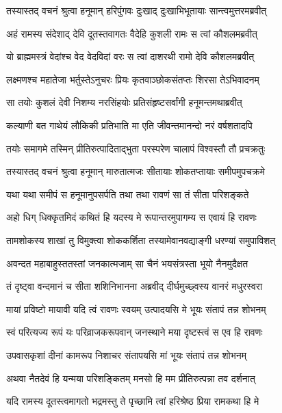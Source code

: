
\twolineshloka
{तस्यास्तद् वचनं श्रुत्वा हनूमान् हरिपुंगवः}
{दुःखाद् दुःखाभिभूतायाः सान्त्वमुत्तरमब्रवीत्} %

\twolineshloka
{अहं रामस्य संदेशाद् देवि दूतस्तवागतः}
{वैदेहि कुशली रामः स त्वां कौशलमब्रवीत्} %

\twolineshloka
{यो ब्राह्ममस्त्रं वेदांश्च वेद वेदविदां वरः}
{स त्वां दाशरथी रामो देवि कौशलमब्रवीत्} %

\twolineshloka
{लक्ष्मणश्च महातेजा भर्तुस्तेऽनुचरः प्रियः}
{कृतवाञ्छोकसंतप्तः शिरसा तेऽभिवादनम्} %

\twolineshloka
{सा तयोः कुशलं देवी निशम्य नरसिंहयोः}
{प्रतिसंहृष्टसर्वांगी हनूमन्तमथाब्रवीत्} %

\twolineshloka
{कल्याणी बत गाथेयं लौकिकी प्रतिभाति मा}
{एति जीवन्तमानन्दो नरं वर्षशतादपि} %

\twolineshloka
{तयोः समागमे तस्मिन् प्रीतिरुत्पादिताद्भुता}
{परस्परेण चालापं विश्वस्तौ तौ प्रचक्रतुः} %

\twolineshloka
{तस्यास्तद् वचनं श्रुत्वा हनूमान् मारुतात्मजः}
{सीतायाः शोकतप्तायाः समीपमुपचक्रमे} %

\twolineshloka
{यथा यथा समीपं स हनूमानुपसर्पति}
{तथा तथा रावणं सा तं सीता परिशङ्कते} %

\twolineshloka
{अहो धिग् धिक्कृतमिदं कथितं हि यदस्य मे}
{रूपान्तरमुपागम्य स एवायं हि रावणः} %

\twolineshloka
{तामशोकस्य शाखां तु विमुक्त्वा शोककर्शिता}
{तस्यामेवानवद्याङ्गी धरण्यां समुपाविशत्} %

\twolineshloka
{अवन्दत महाबाहुस्ततस्तां जनकात्मजाम्}
{सा चैनं भयसंत्रस्ता भूयो नैनमुदैक्षत} %

\twolineshloka
{तं दृष्ट्वा वन्दमानं च सीता शशिनिभानना}
{अब्रवीद् दीर्घमुच्छ्वस्य वानरं मधुरस्वरा} %

\twolineshloka
{मायां प्रविष्टो मायावी यदि त्वं रावणः स्वयम्}
{उत्पादयसि मे भूयः संतापं तन्न शोभनम्} %

\twolineshloka
{स्वं परित्यज्य रूपं यः परिव्राजकरूपवान्}
{जनस्थाने मया दृष्टस्त्वं स एव हि रावणः} %

\twolineshloka
{उपवासकृशां दीनां कामरूप निशाचर}
{संतापयसि मां भूयः संतापं तन्न शोभनम्} %

\twolineshloka
{अथवा नैतदेवं हि यन्मया परिशङ्कितम्}
{मनसो हि मम प्रीतिरुत्पन्ना तव दर्शनात्} %

\twolineshloka
{यदि रामस्य दूतस्त्वमागतो भद्रमस्तु ते}
{पृच्छामि त्वां हरिश्रेष्ठ प्रिया रामकथा हि मे} %

